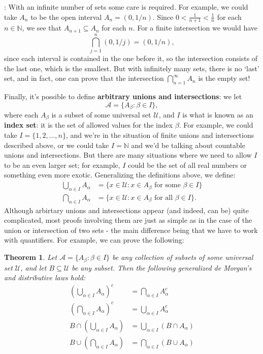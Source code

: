 \documentclass[letterpaper,12pt]{article}
\newtheorem{theorem}{Theorem}
\newcommand{\U}{\mathcal{U}}
\newcommand{\N}{\mathbb{N}}
\begin{document}
: With an infinite number of sets some care is required. For example, we could take $A_n$ to be the open interval $A_n = (0,1/n)$. Since $0<\frac{1}{n+1}<\frac{1}{n}$ for each $n\in\N$, we see that $A_{n+1}\subseteq A_n$ for each $n$. For a finite intersection we would have
\[
 \bigcap_{j=1}^n (0,1/j) = (0,1/n), 
\]
since each interval is contained in the one before it, so the intersection consists of the last one, which is the smallest. But with infinitely many sets, there is no `last' set, and in fact, one can prove that the intersection $\bigcap_{n=1}^\infty A_n$ is the empty set!

Finally, it's possible to define {\bf arbitrary unions and intersections}: we let 
\[
\mathcal{A} = \{A_\beta : \beta\in I\}, 
\]
where each $A_\beta$ is a subset of some universal set $\U$, and $I$ is what is known as an {\bf index set}: it is the set of allowed values for the index $\beta$. For example, we could take $I=\{1,2,\ldots, n\}$, and we're in the situation of finite unions and intersections described above, or we could take $I=\N$ and we'd be talking about countable unions and intersections. But there are many situations where we need to allow $I$ to be an even larger set; for example, $I$ could be the set of all real numbers or something even more exotic. Generalizing the definitions above, we define:
\begin{align*}
 \bigcup_{\alpha\in I}A_\alpha & = \{x\in\U : x\in A_\beta \text{ for some }\beta\in I\}\\
 \bigcap_{\alpha\in I}A_\alpha & = \{x\in\U : x\in A_\beta \text{ for all } \beta\in I\}.
\end{align*}
Although arbirtary unions and intersections appear (and indeed, can be) quite complicated, most proofs involving them are just as simple as in the case of the union or intersection of two sets - the main difference being that we have to work with quantifiers. For example, we can prove the following:
\begin{theorem}
 Let $\mathcal{A} = \{A_\beta : \beta\in I\}$ be any collection of subsets of some universal set $\U$, and let $B\subseteq \U$ be any subset. Then the following generalized de Morgan's and distributive laws hold:
\begin{align}
 \left(\bigcup_{\alpha\in I}A_\alpha\right)^c &= \bigcap_{\alpha\in I}A_\alpha^c\\
 \left(\bigcap_{\alpha\in I}A_\alpha\right)^c &= \bigcup_{\alpha\in I}A_\alpha^c\label{a}\\
 B\cap\left(\bigcup_{\alpha\in I}A_\alpha\right) &= \bigcup_{\alpha\in I}(B\cap A_\alpha)\label{b}\\
 B\cup\left(\bigcap_{\alpha\in I}A_\alpha\right) &= \bigcap_{\alpha\in I}(B\cup A_\alpha)
\end{align}
\end{theorem}
\end{document}
